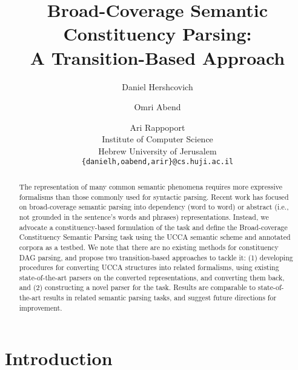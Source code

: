 \documentclass[11pt]{article}
\title{Broad-Coverage Semantic Constituency Parsing: \\
A Transition-Based Approach}
\author{Daniel Hershcovich \and Omri Abend \and Ari Rappoport \\
  Institute of Computer Science \\
  Hebrew University of Jerusalem \\
  {\tt \{danielh,oabend,arir\}@cs.huji.ac.il}
}
\date{}
\begin{document}
\maketitle

\begin{abstract}

  The representation of many common semantic phenomena requires
  more expressive formalisms than those commonly used for syntactic parsing.
  Recent work has focused on broad-coverage semantic parsing into dependency
  (word to word) or abstract (i.e., not grounded in the sentence's
  words and phrases) representations.
  Instead, we advocate a constituency-based formulation of the
  task and define the Broad-coverage Constituency Semantic Parsing task
  using the UCCA semantic scheme and annotated corpora as a testbed.
  We note that there are no existing methods for constituency DAG parsing,
  and propose two transition-based approaches to tackle it:
  (1) developing procedures for converting UCCA structures into related
  formalisms, using existing state-of-the-art parsers on the converted representations,
  and converting them back, and (2) constructing a novel parser for the task.
  Results are comparable to state-of-the-art results in related
  semantic parsing tasks, and suggest future directions for improvement.
  
  
\end{abstract}



\section{Introduction}

\end{document}
